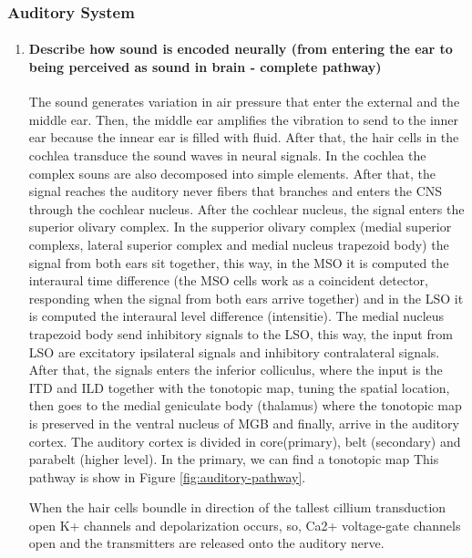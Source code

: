 \documentclass[12pt,article,oneside,a4paper]{memoir}
\begin{document}
\subsubsection{Auditory System}
\begin{enumerate}
\item \paragraph{Describe how sound is encoded neurally (from entering the ear to being perceived as sound in brain - complete pathway)}\label{question:auditory-pathway}

The sound generates variation in air pressure that enter the external and the middle ear. Then, the middle ear amplifies the vibration to send to the inner ear because the innear ear is filled with fluid. After that, the hair cells in the cochlea transduce the sound waves in neural signals. In the cochlea the complex souns are also decomposed into simple elements. After that, the signal reaches the auditory never fibers that branches and enters the CNS through the cochlear nucleus. After the cochlear nucleus, the signal enters the superior olivary complex. In the supperior olivary complex (medial superior complexs, lateral superior complex and medial nucleus trapezoid body) the signal from both ears sit together, this way, in the MSO it is computed the interaural time difference (the MSO cells work as a coincident detector, responding when the signal from both ears arrive together) and in the LSO it is computed the interaural level difference (intensitie). The medial nucleus trapezoid body send inhibitory signals to the LSO, this way, the input from LSO are excitatory ipsilateral signals and inhibitory contralateral signals. After that, the signals enters the inferior colliculus, where the input is the ITD and ILD together with the tonotopic map, tuning the spatial location, then goes to the medial geniculate body (thalamus) where the tonotopic map is preserved in the ventral nucleus of MGB and finally, arrive in the auditory cortex. The auditory cortex is divided in core(primary), belt (secondary) and parabelt (higher level). In the primary, we can find a tonotopic map This pathway is show in Figure \ref{fig:auditory-pathway}.

When the hair cells boundle in direction of the tallest cillium transduction open K+ channels and depolarization occurs, so, Ca2+ voltage-gate channels open and the transmitters are released onto the auditory nerve.


\end{enumerate}
\end{document}
